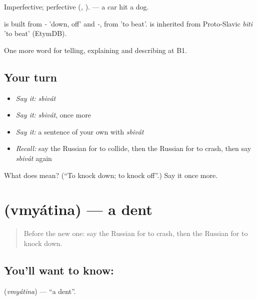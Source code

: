 Imperfective; perfective \emph{} (\emph{, }). \emph{  } — a car hit a dog.

\begin{cousinweb}
\emph{} is built from \emph{-} 'down, off' and \emph{-}, from \emph{} 'to beat'. \emph{} is inherited from Proto-Slavic \emph{biti} 'to beat' (EtymDB).
\end{cousinweb}

\begin{grammarlens}[title={What you've built}]
One more word for telling, explaining and describing at B1.
\end{grammarlens}

\subsection*{Your turn}
\begin{itemize}
\raggedright
  \item \emph{Say it:} \emph{sbivát}
  \item \emph{Say it:} \emph{sbivát}, once more
  \item \emph{Say it:} a sentence of your own with \emph{sbivát}
  \item \emph{Recall:} say the Russian for to collide, then the Russian for to crash, then say \emph{sbivát} again
\end{itemize}

\begin{tcolorbox}[breakable,colback=teal!4,colframe=teal!35!black,title={Before you move on}]
What does  mean? (\textquotedblleft{}To knock down; to knock off\textquotedblright{}.) Say it once more.
\end{tcolorbox}
\section[\texorpdfstring{\ru{вмятина} (vmyátina)}{вмятина (vmyátina)}]{ (vmyátina) — a dent}

\label{lesson:RU-C410-vmyatina}



\begin{quote}
Before the new one: say the Russian for to crash, then the Russian for to knock down.
\end{quote}

\subsection*{You'll want to know: }
\textbf{} (\emph{vmyátina}) — \textquotedblleft{}a dent\textquotedblright{}.

